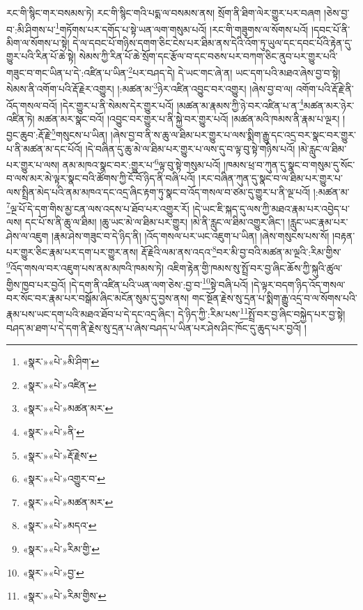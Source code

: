 རང་གི་སྙིང་གར་བསམས་ཏེ། རང་གི་སྙིང་གའི་པདྨ་ལ་བསམས་ནས། སྲོག་ནི་ཐིག་ལེར་གྱུར་པར་བཞག །ཅེས་བྱ་བ་:མི་ཤིགས་པ་\footnote{«སྣར་»«པེ་»མི་ཤིག་}གཏོགས་པར་དགོད་པ་སྟེ་ཡན་ལག་གསུམ་པའོ། །རང་གི་གཟུགས་ལ་སོགས་པའོ། །དབང་པོ་ནི་མིག་ལ་སོགས་པ་སྟེ། དེ་ལ་དབང་པོ་གཉིས་དགག་ཅིང་ངེས་པར་ཐིམ་ནས་དེའི་འོག་ཏུ་ཡུལ་དང་དབང་པོའི་རྟེན་དུ་གྱུར་པའི་རིན་པོ་ཆེ་སྟེ། སེམས་ཀྱི་རིན་པོ་ཆེ་སྲོག་དང་རྩོལ་བ་དང་བཅས་པར་བཀག་ཅིང་ནུབ་པར་གྱུར་པའི་གཟུང་བ་གང་ཡིན་པ་དེ་:འཛིན་པ་ཡིན་\footnote{«སྣར་»«པེ་»འཛིན་}པར་བཤད་དེ། དེ་ཡང་གང་ཞེ་ན། ཡང་དག་པའི་མཐའ་ཞེས་བྱ་བ་སྟེ། སེམས་ནི་འགོག་པའི་རྡོ་རྗེར་འགྱུར། །:མཚན་མ་\footnote{«སྣར་»«པེ་»མཚན་མར་}ཉེར་འཛིན་འབྱུང་བར་འགྱུར། །ཞེས་བྱ་བ་ལ། འགོག་པའི་རྡོ་རྗེ་ནི་འོད་གསལ་བའོ། །དེར་གྱུར་པ་ནི་སེམས་དེར་གྱུར་པའོ། །མཚན་མ་རྣམས་ཀྱི་ཉེ་བར་འཛིན་པ་ན་\footnote{«སྣར་»«པེ་»ནི་}མཚན་མར་ཉེར་འཛིན་ཏེ། མཚན་མར་སྣང་བའོ། །འབྱུང་བར་གྱུར་པ་ནི་སྐྱེ་བར་གྱུར་པའོ། །མཚན་མའི་ཁམས་ནི་རྣམ་པ་ལྔར། །བྱང་ཆུབ་:རྡོ་རྗེ་\footnote{«སྣར་»«པེ་»རྡོ་རྗེས་}གསུངས་པ་ཡིན། །ཞེས་བྱ་བ་ནི་ས་ཆུ་ལ་ཐིམ་པར་གྱུར་པ་ལས་སྨིག་རྒྱུ་དང་འདྲ་བར་སྣང་བར་གྱུར་པ་ནི་མཚན་མ་དང་པོའོ། །དེ་བཞིན་དུ་ཆུ་མེ་ལ་ཐིམ་པར་གྱུར་པ་ལས་དུ་བ་ལྟ་བུ་སྟེ་གཉིས་པའོ། །མེ་རླུང་ལ་ཐིམ་པར་གྱུར་པ་ལས། ནམ་མཁའ་སྣང་བར་:གྱུར་པ་\footnote{«སྣར་»«པེ་»འགྱུར་བ་}ལྟ་བུ་སྟེ་གསུམ་པའོ། །ཁམས་ཕྲ་བ་ཀུན་དུ་སྣང་བ་གསུམ་དུ་སོང་བ་ལས་མར་མེ་ལྟར་སྣང་བའི་ཚོགས་ཀྱི་ངོ་བོ་ཉིད་ནི་བཞི་པའོ། །རང་བཞིན་ཀུན་དུ་སྣང་བ་ལ་ཐིམ་པར་གྱུར་པ་ལས་སྤྲིན་མེད་པའི་ནམ་མཁའ་དང་འདྲ་ཞིང་རྟག་ཏུ་སྣང་བ་འོད་གསལ་བ་ཙམ་དུ་གྱུར་པ་ནི་ལྔ་པའོ། །:མཚན་མ་\footnote{«སྣར་»«པེ་»མཚན་མར་}ལྔ་པོ་དེ་དག་གིས་མྱ་ངན་ལས་འདས་པ་ཐོབ་པར་འགྱུར་རོ། །དེ་ཡང་ཇི་སྐད་དུ་ལས་ཀྱི་མཐའ་རྣམ་པར་འབྱེད་པ་ལས། དང་པོ་ས་ནི་ཆུ་ལ་ཐིམ། །ཆུ་ཡང་མེ་ལ་ཐིམ་པར་གྱུར། །མེ་ནི་རླུང་ལ་ཐིམ་འགྱུར་ཞིང་། །རླུང་ཡང་རྣམ་པར་ཤེས་ལ་འཇུག །རྣམ་ཤེས་གཟུང་བ་དེ་ཉིད་ནི། །འོད་གསལ་པར་ཡང་འཇུག་པ་ཡིན། །ཞེས་གསུངས་པས་སོ། །བརྟན་པར་གྱུར་ཅིང་རྣམ་པར་དག་པར་གྱུར་ནས། རྡོ་རྗེའི་ལམ་ནས་འདའ་\footnote{«སྣར་»«པེ་»མདའ་}བར་མི་བྱ་བའི་མཚན་མ་ལྔའི་:རིམ་གྱིས་\footnote{«སྣར་»«པེ་»རིམ་གྱི་}འོད་གསལ་བར་འཇུག་པས་ནམ་མཁའི་ཁམས་ཏེ། འཇིག་རྟེན་གྱི་ཁམས་སུ་སྤྲོ་བར་བྱ་ཞིང་ཆོས་ཀྱི་སྐུའི་ཚུལ་གྱིས་ཁྱབ་པར་བྱའོ། །དེ་དག་ནི་འཛིན་པའི་ཡན་ལག་ཅེས་:བྱ་བ་\footnote{«སྣར་»«པེ་»བྱ་}སྟེ་བཞི་པའོ། །དེ་ལྟར་བདག་ཉིད་འོད་གསལ་བར་སོང་བར་རྣམ་པར་བསྒོམ་ཞིང་མངོན་སུམ་དུ་བྱས་ནས། གང་སྔོན་རྗེས་སུ་དྲན་པ་སྨིག་རྒྱུ་འདྲ་བ་ལ་སོགས་པའི་རྣམ་པས་ཡང་དག་པའི་མཐའ་ཐོབ་པ་དེ་དང་འདྲ་ཞིང་། དེ་ཉིད་ཀྱི་:རིམ་པས་\footnote{«སྣར་»«པེ་»རིམ་གྱིས་}སྤྲོ་བར་བྱ་ཞིང་བསྐྱེད་པར་བྱ་སྟེ། བཤད་མ་ཐག་པ་དེ་དག་ནི་རྗེས་སུ་དྲན་པ་ཞེས་བཤད་པ་ཡིན་པར་ཤེས་ཤིང་ཁོང་དུ་ཆུད་པར་བྱའོ། །
